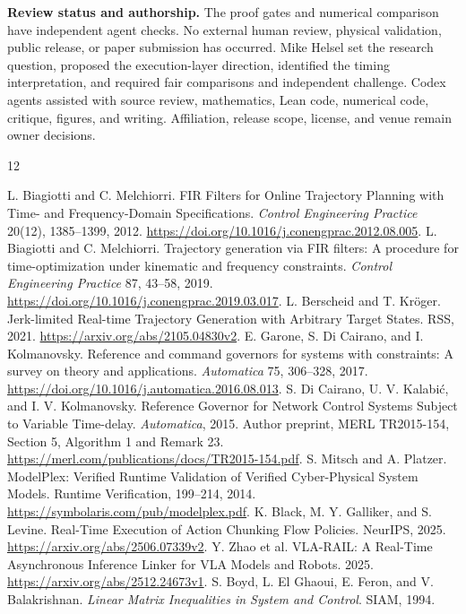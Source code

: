 \documentclass[10pt,letterpaper]{article}
\begin{document}
\textbf{Review status and authorship.}
The proof gates and numerical comparison have independent agent checks.
No external human review, physical validation, public release, or paper
submission has occurred. Mike Helsel set the research question, proposed the
execution-layer direction, identified the timing interpretation, and required
fair comparisons and independent challenge. Codex agents assisted with source
review, mathematics, Lean code, numerical code, critique, figures, and writing.
Affiliation, release scope, license, and venue remain owner decisions.

\begin{thebibliography}{12}\small\raggedright
{} L. Biagiotti and C. Melchiorri.
FIR Filters for Online Trajectory Planning with Time- and Frequency-Domain
Specifications. \emph{Control Engineering Practice} 20(12), 1385--1399, 2012.
\url{https://doi.org/10.1016/j.conengprac.2012.08.005}.
 L. Biagiotti and C. Melchiorri.
Trajectory generation via FIR filters: A procedure for time-optimization under
kinematic and frequency constraints. \emph{Control Engineering Practice}
87, 43--58, 2019. \url{https://doi.org/10.1016/j.conengprac.2019.03.017}.
 L. Berscheid and T. Kr\"oger.
Jerk-limited Real-time Trajectory Generation with Arbitrary Target States.
RSS, 2021. \url{https://arxiv.org/abs/2105.04830v2}.
 E. Garone, S. Di Cairano, and I. Kolmanovsky.
Reference and command governors for systems with constraints: A survey on
theory and applications. \emph{Automatica} 75, 306--328, 2017.
\url{https://doi.org/10.1016/j.automatica.2016.08.013}.
 S. Di Cairano, U. V. Kalabi\'c, and I. V. Kolmanovsky.
Reference Governor for Network Control Systems Subject to Variable Time-delay.
\emph{Automatica}, 2015. Author preprint, MERL TR2015-154, Section 5,
Algorithm 1 and Remark 23.
\url{https://merl.com/publications/docs/TR2015-154.pdf}.
 S. Mitsch and A. Platzer.
ModelPlex: Verified Runtime Validation of Verified Cyber-Physical System Models.
Runtime Verification, 199--214, 2014.
\url{https://symbolaris.com/pub/modelplex.pdf}.
 K. Black, M. Y. Galliker, and S. Levine.
Real-Time Execution of Action Chunking Flow Policies. NeurIPS, 2025.
\url{https://arxiv.org/abs/2506.07339v2}.
 Y. Zhao et al.
VLA-RAIL: A Real-Time Asynchronous Inference Linker for VLA Models and Robots.
2025. \url{https://arxiv.org/abs/2512.24673v1}.
 S. Boyd, L. El Ghaoui, E. Feron, and V. Balakrishnan.
\emph{Linear Matrix Inequalities in System and Control}. SIAM, 1994.

\end{thebibliography}
\end{document}
